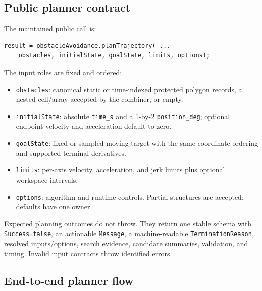 \documentclass[10pt,letterpaper]{article}
\newcommand{\file}[1]{\nolinkurl{#1}}
\begin{document}
\subsection{Public planner contract}

The maintained public call is:

\begin{lstlisting}
result = obstacleAvoidance.planTrajectory( ...
    obstacles, initialState, goalState, limits, options);
\end{lstlisting}

The input roles are fixed and ordered:

\begin{itemize}
  \item \file{obstacles}: canonical static or time-indexed protected polygon
  records, a nested cell/array accepted by the combiner, or empty.
  \item \file{initialState}: absolute \file{time_s} and a 1-by-2
  \file{position_deg}; optional endpoint velocity and acceleration default to
  zero.
  \item \file{goalState}: fixed or sampled moving target with the same
  coordinate ordering and supported terminal derivatives.
  \item \file{limits}: per-axis velocity, acceleration, and jerk limits plus
  optional workspace intervals.
  \item \file{options}: algorithm and runtime controls. Partial structures are
  accepted; defaults have one owner.
\end{itemize}

Expected planning outcomes do not throw. They return one stable schema with
\file{Success=false}, an actionable \file{Message}, a machine-readable
\file{TerminationReason}, resolved inputs/options, search evidence, candidate
summaries, validation, and timing. Invalid input contracts throw identified
errors.

\subsection{End-to-end planner flow}
\end{document}
